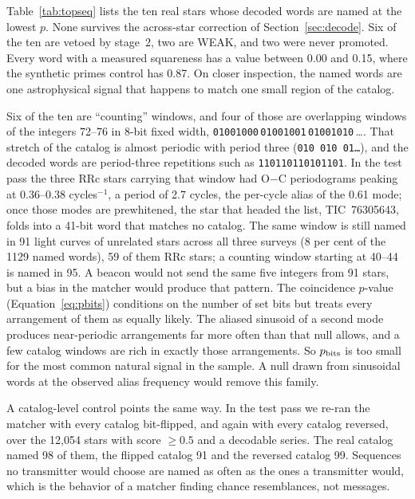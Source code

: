 \documentclass[final,5p]{elsarticle}
\newcommand{\oc}{O$-$C}
\begin{document}
Table~\ref{tab:topseq} lists the ten real stars whose decoded words are named at the lowest $p$. None survives the across-star correction of Section~\ref{sec:decode}. Six of the ten are vetoed by stage~2, two are WEAK, and two were never promoted. Every word with a measured squareness has a value between 0.00 and 0.15, where the synthetic primes control has 0.87. On closer inspection, the named words are one astrophysical signal that happens to match one small region of the catalog.

Six of the ten are ``counting'' windows, and four of those are overlapping windows of the integers 72--76 in 8-bit fixed width, \texttt{01001000}\,\allowbreak\texttt{01001001}\,\allowbreak\texttt{01001010}\,\allowbreak\ldots. That stretch of the catalog is almost periodic with period three (\texttt{010\,010\,01\ldots}), and the decoded words are period-three repetitions such as \texttt{110110110101101}. In the test pass the three RRc stars carrying that window had \oc{} periodograms peaking at 0.36--0.38 cycles$^{-1}$, a period of 2.7 cycles, the per-cycle alias of the 0.61 mode; once those modes are prewhitened, the star that headed the list, TIC~76305643, folds into a 41-bit word that matches no catalog. The same window is still named in 91 light curves of unrelated stars across all three surveys (8 per cent of the 1129 named words), 59 of them RRc stars; a counting window starting at 40--44 is named in 95. A beacon would not send the same five integers from 91 stars, but a bias in the matcher would produce that pattern. The coincidence $p$-value (Equation~\ref{eq:pbits}) conditions on the number of set bits but treats every arrangement of them as equally likely. The aliased sinusoid of a second mode produces near-periodic arrangements far more often than that null allows, and a few catalog windows are rich in exactly those arrangements. So $p_{\rm bits}$ is too small for the most common natural signal in the sample. A null drawn from sinusoidal words at the observed alias frequency would remove this family.

A catalog-level control points the same way. In the test pass we re-ran the matcher with every catalog bit-flipped, and again with every catalog reversed, over the 12{,}054 stars with score $\ge0.5$ and a decodable series. The real catalog named 98 of them, the flipped catalog 91 and the reversed catalog 99. Sequences no transmitter would choose are named as often as the ones a transmitter would, which is the behavior of a matcher finding chance resemblances, not messages.
\end{document}

